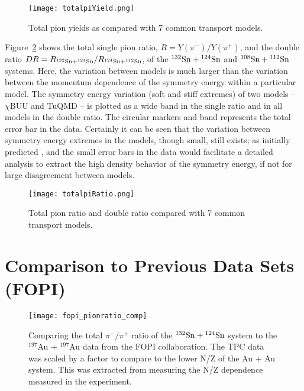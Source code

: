 \begin{figure}[!htb]
\centering
\texttt{[image: totalpiYield.png]}
\caption{Total pion yields as compared with 7 common transport models.}
\label{fig:totalpiYield}
\end{figure}

Figure~\ref{fig:totalpiRatio} shows the total single pion ratio, $R = Y(\pi^-)/Y(\pi^+)$, and the double ratio  $DR = R_{{}^{132}\mathrm{Sn} + {}^{124}\mathrm{Sn}}/R_{{}^{124}\mathrm{Sn} + {}^{112}\mathrm{Sn}}$, of the ${}^{132}\mathrm{Sn} + {}^{124}\mathrm{Sn}$ and ${}^{108}\mathrm{Sn} + {}^{112}\mathrm{Sn}$ systems. Here, the variation between models is much larger than the variation between the momentum dependence of the symmetry energy within a particular model. The symmetry energy variation (soft and stiff extremes) of two models -- $\chi$BUU and TuQMD -- is plotted as a wide band in the single ratio and in all models in the double ratio. The circular markers and band represents the total error bar in the data. Certainly it can be seen that the variation between symmetry energy extremes in the models, though small, still exists; as initially predicted \cite{baoan_piprod1,baoan_piprod2}, and the small error bars in the data would facilitate a detailed analysis to extract the high density behavior of the symmetry energy, if not for large disagreement between models. 



\begin{figure}[!htb]
\centering
\texttt{[image: totalpiRatio.png]}
\caption{Total pion ratio and double ratio compared with 7 common transport models.}
\label{fig:totalpiRatio}
\end{figure}




\section{Comparison to Previous Data Sets (FOPI)}


\begin{figure}[!htb]
\centering
\texttt{[image: fopi\_pionratio\_comp]}
\caption{Comparing the total $\pi^-/\pi^+$ ratio of the ${}^{132}\mathrm{Sn} + {}^{124}\mathrm{Sn}$ system to the ${}^{197}$Au + ${}^{197}$Au data from the FOPI collaboration. The \spirit TPC data was scaled by a factor to compare to the lower N/Z of the Au + Au system. This was extracted from measuring the N/Z dependence measured in the experiment. }
\label{fig:fopiPionRatio}
\end{figure}

